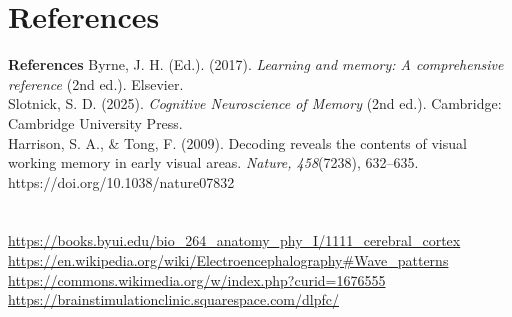 \documentclass{beamer}
\begin{document}
\section{References}
\begin{frame}{\textbf{References}}
  \large
  Byrne, J. H. (Ed.). (2017). \textit{Learning and memory: A comprehensive reference} (2nd ed.). Elsevier.\\
  Slotnick, S. D. (2025). \textit{Cognitive Neuroscience of Memory} (2nd ed.). Cambridge: Cambridge University Press.\\
  Harrison, S. A., \& Tong, F. (2009). Decoding reveals the contents of visual working memory in early visual areas. \textit{Nature, 458}(7238), 632–635. https://doi.org/10.1038/nature07832\\~\\~\\


  \url{https://books.byui.edu/bio\_264\_anatomy\_phy\_I/1111\_cerebral\_cortex}\\
  \url{https://en.wikipedia.org/wiki/Electroencephalography#Wave\_patterns}\\
  \url{https://commons.wikimedia.org/w/index.php?curid=1676555}\\
  \url{https://brainstimulationclinic.squarespace.com/dlpfc/}



\end{frame}
\end{document}
